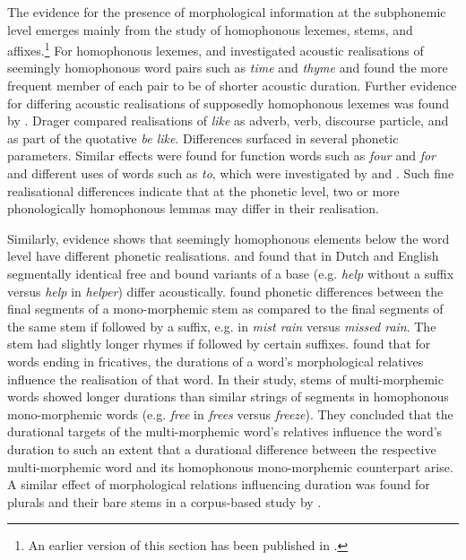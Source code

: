 The evidence for the presence of morphological information at the subphonemic level emerges mainly from the study of homophonous lexemes, stems, and affixes.\protect\footnote{An earlier version of this section has been published in \protect\cite{Schmitz2021a}.} For homophonous lexemes, \citet{Gahl2008} and \citet{Lohmann2018} investigated acoustic realisations of seemingly homophonous word pairs such as \textit{time} and \textit{thyme} and found the more frequent member of each pair to be of shorter acoustic duration. Further evidence for differing acoustic realisations of supposedly homophonous lexemes was found by \citet{Drager2011}. Drager compared realisations of \textit{like} as adverb, verb, discourse particle, and as part of the quotative \textit{be like}. Differences surfaced in several phonetic parameters. Similar effects were found for function words such as \textit{four} and \textit{for} and different uses of words such as \textit{to}, which were investigated by \citet{Lavoie2002} and \citet{Jurafsky2002}. Such fine realisational differences indicate that at the phonetic level, two or more phonologically homophonous lemmas may differ in their realisation.

Similarly, evidence shows that seemingly homophonous elements below the word level have different phonetic realisations. \citet{Kemps2005a} and \citet{Kemps2005b} found that in Dutch and English segmentally identical free and bound variants of a base (e.g. \textit{help} without a suffix versus \textit{help} in \textit{helper}) differ acoustically. \citet{Sugahara2004,Sugahara2009} found phonetic differences between the final segments of a mono-morphemic stem as compared to the final segments of the same stem if followed by a suffix, e.g. in \textit{mist rain} versus \textit{missed rain}. The stem had slightly longer rhymes if followed by certain suffixes. \citet{Seyfarth2017} found that for words ending in fricatives, the durations of a word’s morphological relatives influence the realisation of that word. In their study, stems of multi-morphemic words showed longer durations than similar strings of segments in homophonous mono-morphemic words (e.g. \textit{free} in \textit{frees} versus \textit{freeze}). They concluded that the durational targets of the multi-morphemic word’s relatives influence the word’s duration to such an extent that a durational difference between the respective multi-morphemic word and its homophonous mono-morphemic counterpart arise. A similar effect of morphological relations influencing duration was found for plurals and their bare stems in a corpus-based study by \citet{Engemann2021}.

